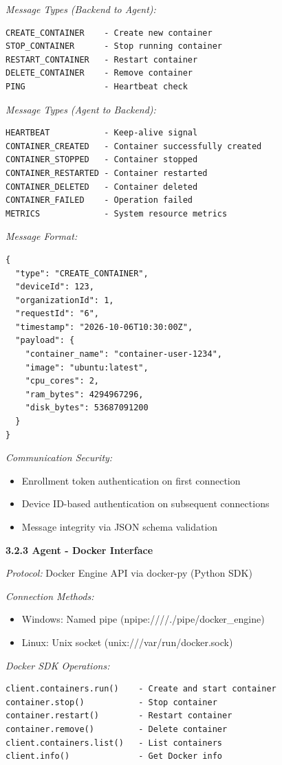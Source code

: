 \documentclass[12pt,a4paper]{article}
\begin{document}
\textit{Message Types (Backend to Agent):}
\begin{verbatim}
CREATE_CONTAINER    - Create new container
STOP_CONTAINER      - Stop running container
RESTART_CONTAINER   - Restart container
DELETE_CONTAINER    - Remove container
PING                - Heartbeat check
\end{verbatim}

\textit{Message Types (Agent to Backend):}
\begin{verbatim}
HEARTBEAT           - Keep-alive signal
CONTAINER_CREATED   - Container successfully created
CONTAINER_STOPPED   - Container stopped
CONTAINER_RESTARTED - Container restarted
CONTAINER_DELETED   - Container deleted
CONTAINER_FAILED    - Operation failed
METRICS             - System resource metrics
\end{verbatim}

\textit{Message Format:}
\begin{verbatim}
{
  "type": "CREATE_CONTAINER",
  "deviceId": 123,
  "organizationId": 1,
  "requestId": "6",
  "timestamp": "2026-10-06T10:30:00Z",
  "payload": {
    "container_name": "container-user-1234",
    "image": "ubuntu:latest",
    "cpu_cores": 2,
    "ram_bytes": 4294967296,
    "disk_bytes": 53687091200
  }
}
\end{verbatim}

\textit{Communication Security:}
\begin{itemize}[noitemsep]
    \item Enrollment token authentication on first connection
    \item Device ID-based authentication on subsequent connections
    \item Message integrity via JSON schema validation
\end{itemize}

\textbf{3.2.3 Agent - Docker Interface}

\textit{Protocol:} Docker Engine API via docker-py (Python SDK)

\textit{Connection Methods:}
\begin{itemize}[noitemsep]
    \item Windows: Named pipe (npipe:////./pipe/docker\_engine)
    \item Linux: Unix socket (unix:///var/run/docker.sock)
\end{itemize}

\textit{Docker SDK Operations:}
\begin{verbatim}
client.containers.run()    - Create and start container
container.stop()           - Stop container
container.restart()        - Restart container
container.remove()         - Delete container
client.containers.list()   - List containers
client.info()              - Get Docker info
\end{verbatim}
\end{document}
